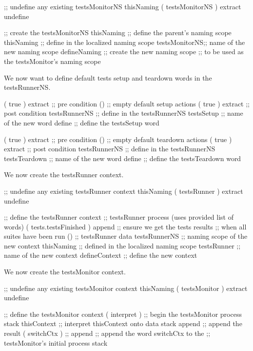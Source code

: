 \startJoylolCode
  ;; undefine any existing testsMonitorNS
  thisNaming
  ( testsMonitorNS ) extract
  undefine
  
  ;; create the testsMonitorNS
  thisNaming    ;; define the parent's naming scope
  thisNaming    ;; define in the localized naming scope
  testsMonitorNS;; name of the new naming scope
  defineNaming  ;; create the new naming scope
                ;; to be used as the testsMonitor's naming scope
\stopJoylolCode

We now want to define default tests setup and teardown words in the 
testsRunnerNS. 

\startJoylolCode
  ( { true } ) extract ;; pre condition
  ()            ;; empty default setup actions
  ( { true } ) extract ;; post condition
  testsRunnerNS ;; define in the testsRunnerNS
  testsSetup    ;; name of the new word
  define        ;; define the testsSetup word
\stopJoylolCode

\startJoylolCode
  ( { true } ) extract ;; pre condition
  ()            ;; empty default teardown actions
  ( { true } ) extract ;; post condition
  testsRunnerNS ;; define in the testsRunnerNS
  testsTeardown ;; name of the new word
  define        ;; define the testsTeardown word
\stopJoylolCode

We now create the testsRunner context.

\startJoylolCode
  ;; undefine any existing testsRunner context
  thisNaming
  ( testsRunner ) extract
  undefine

  ;; define the testsRunner context
                ;; testsRunner process (uses provided list of words)
  ( tests.testsFinished )
  append        ;; ensure we get the tests results
                ;; when all suites have been run
  ()            ;; testsRunner data
  testsRunnerNS ;; naming scope of the new context
  thisNaming    ;; defined in the localized naming scope
  testsRunner   ;; name of the new context
  defineContext ;; define the new context
\stopJoylolCode

We now create the testsMonitor context.

\startJoylolCode
  ;; undefine any existing testsMonitor context
  thisNaming
  ( testsMonitor ) extract
  undefine

  ;; define the testsMonitor context
  ( interpret )   ;; begin the testsMonitor process stack
  thisContext     ;; interpret thisContext onto data stack
  append          ;; append the result
  ( switchCtx )   ;;
  append          ;; append the word switchCtx to the
                  ;; testsMonitor's initial process stack
  
